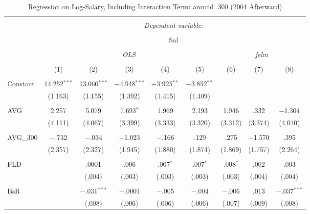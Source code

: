 
\begin{table}[H] \centering
  \caption{Regression on Log-Salary, Including Interaction Term: around .300 (2004 Afterward)} 
  \label{AVG300_D}
\tiny
\begin{tabular}{@{\extracolsep{5pt}}lcccccccc}
\\[-1.8ex]\hline
\hline \\[-1.8ex]
 & \multicolumn{8}{c}{\textit{Dependent variable:}} \\
\cline{2-9}
\\[-1.8ex] & \multicolumn{8}{c}{Sal} \\
\\[-1.8ex] & \multicolumn{5}{c}{\textit{OLS}} & \multicolumn{3}{c}{\textit{felm}} \\
\\[-1.8ex] & (1) & (2) & (3) & (4) & (5) & (6) & (7) & (8)\\
\hline \\[-1.8ex]
 Constant & 14.252$^{***}$ & 13.060$^{***}$ & $-$4.948$^{***}$ & $-$3.925$^{**}$ & $-$3.852$^{**}$ &  &  &  \\
  & (1.163) & (1.155) & (1.392) & (1.415) & (1.409) &  &  &  \\
  & & & & & & & & \\
 AVG & 2.257 & 5.079 & 7.693$^{*}$ & 1.969 & 2.193 & 1.946 & .332 & $-$1.304 \\
  & (4.111) & (4.067) & (3.399) & (3.333) & (3.320) & (3.312) & (3.374) & (4.010) \\
  & & & & & & & & \\
 AVG\_300 & $-$.732 & $-$.034 & $-$1.023 & $-$.166 & .129 & .275 & $-$1.570 & .395 \\
  & (2.357) & (2.327) & (1.945) & (1.880) & (1.874) & (1.869) & (1.757) & (2.264) \\
  & & & & & & & & \\
 FLD &  & .0001 & .006 & .007$^{*}$ & .007$^{*}$ & .008$^{*}$ & .002 & .003 \\
  &  & (.004) & (.003) & (.003) & (.003) & (.003) & (.004) & (.004) \\
  & & & & & & & & \\
 BsR &  & $-$.031$^{***}$ & $-$.0001 & $-$.005 & $-$.004 & $-$.006 & .013 & $-$.037$^{***}$ \\
  &  & (.008) & (.006) & (.006) & (.006) & (.007) & (.009) & (.008) \\

\end{tabular}
\end{table}
